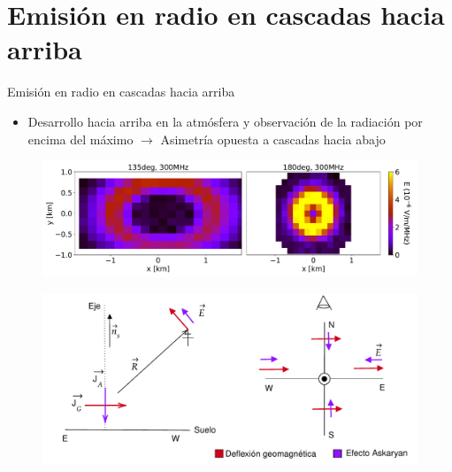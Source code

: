 \documentclass{beamer}
\begin{document}
	\section{Emisión en radio en cascadas hacia arriba}
	\begin{frame}{Emisión en radio en cascadas hacia arriba}
		\begin{itemize}
			\item Desarrollo hacia arriba en la atmósfera y observación de la radiación por encima del máximo $\rightarrow$ Asimetría opuesta a cascadas hacia abajo
		\end{itemize}
		\begin{figure}[H]
		\centering
		\includegraphics[width=.75\linewidth]{figures/Radio_UG/Comparativa_0_45deg}
	\end{figure}
	\begin{figure}[H]
	\centering
	\includegraphics[width=.65\linewidth]{figures/Radio_UG/Polarizacion_UG}
	\end{figure}

	\end{frame}
\end{document}
